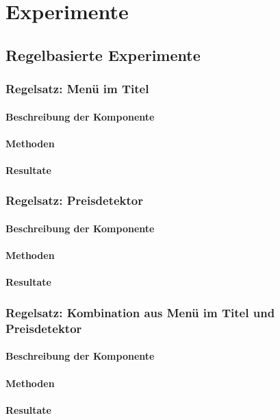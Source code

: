 \section{Experimente}

\subsection{Regelbasierte Experimente}
\subsubsection{Regelsatz: Menü im Titel}
\paragraph{Beschreibung der Komponente}
\paragraph{Methoden}
\paragraph{Resultate}
\subsubsection{Regelsatz: Preisdetektor}
\paragraph{Beschreibung der Komponente}
\paragraph{Methoden}
\paragraph{Resultate}
\subsubsection{Regelsatz: Kombination aus Menü im Titel und Preisdetektor}
\paragraph{Beschreibung der Komponente}
\paragraph{Methoden}
\paragraph{Resultate}
